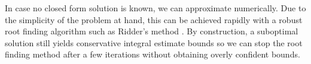 In case no closed form solution is known, we can approximate numerically. Due to the simplicity of the problem at hand, this can be achieved rapidly with a robust root finding algorithm such as Ridder's method \cite{ridders1979}. By construction, a suboptimal solution still yields conservative integral estimate bounds so we can stop the root finding method after a few iterations without obtaining overly confident bounds. 

%
%
%
%
